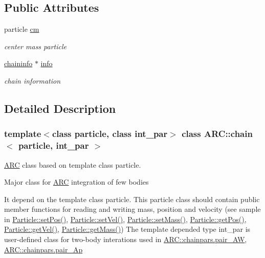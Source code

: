 \subsection*{Public Attributes}
\begin{DoxyCompactItemize}
\item 
particle \hyperlink{classARC_1_1chain_a2eead75bd916fa7ffc05341645527847}{cm}
\begin{DoxyCompactList}\small\item\em center mass particle \end{DoxyCompactList}\item 
\hyperlink{classARC_1_1chaininfo}{chaininfo} $\ast$ \hyperlink{classARC_1_1chain_a7ad20a60e038d16522c11d7fccb47648}{info}
\begin{DoxyCompactList}\small\item\em chain information \end{DoxyCompactList}\end{DoxyCompactItemize}


\subsection{Detailed Description}
\subsubsection*{template$<$class particle, class int\+\_\+par$>$\newline
class A\+R\+C\+::chain$<$ particle, int\+\_\+par $>$}

\hyperlink{namespaceARC}{A\+RC} class based on template class particle. 

Major class for \hyperlink{namespaceARC}{A\+RC} integration of few bodies

It depend on the template class particle. This particle class should contain public member functions for reading and writing mass, position and velocity (see sample in \hyperlink{classParticle_a97d76b66aed57834c105b78b10643b81}{Particle\+::set\+Pos()}, \hyperlink{classParticle_a07c405254ac3f03854e7523ff473c828}{Particle\+::set\+Vel()}, \hyperlink{classParticle_a620f479862b90468a77da4e9cf5c0ff5}{Particle\+::set\+Mass()}, \hyperlink{classParticle_a4ec76421cddd91b1f27357fb182f6923}{Particle\+::get\+Pos()}, \hyperlink{classParticle_ab3d63df7f8c22f232b096ae33b6ea3ac}{Particle\+::get\+Vel()}, \hyperlink{classParticle_a2576aff503f68e78ced91406512b1255}{Particle\+::get\+Mass()}) The template depended type int\+\_\+par is user-\/defined class for two-\/body interations used in \hyperlink{classARC_1_1chainpars_a9558124278a55c0301642e1df63be063}{A\+R\+C\+::chainpars.\+pair\+\_\+\+AW}, \hyperlink{classARC_1_1chainpars_a80fcc6e3b5ce69025126bc49d90f233c}{A\+R\+C\+::chainpars.\+pair\+\_\+\+Ap}

